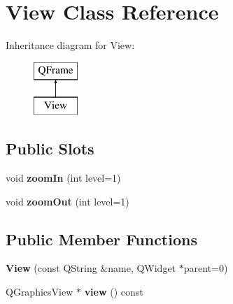 \hypertarget{class_view}{}\section{View Class Reference}
\label{class_view}
Inheritance diagram for View\+:\begin{figure}[H]
\begin{center}
\leavevmode
\includegraphics[height=2.000000cm]{class_view}
\end{center}
\end{figure}
\subsection*{Public Slots}
\begin{DoxyCompactItemize}
\item 
\mbox{\label{class_view_a717d325ccb0b67da221ba69f8fac4eb0}} 
void {\bfseries zoom\+In} (int level=1)
\item 
\mbox{\label{class_view_adf6fef596278977c317260970a694ac2}} 
void {\bfseries zoom\+Out} (int level=1)
\end{DoxyCompactItemize}
\subsection*{Public Member Functions}
\begin{DoxyCompactItemize}
\item 
\mbox{\label{class_view_a4096da0b5a8ef74aaa5d01b9e856c846}} 
{\bfseries View} (const Q\+String \&name, Q\+Widget $\ast$parent=0)
\item 
\mbox{\label{class_view_a0b2f73ccc43e38018031579347c2eddb}} 
Q\+Graphics\+View $\ast$ {\bfseries view} () const
\end{DoxyCompactItemize}

